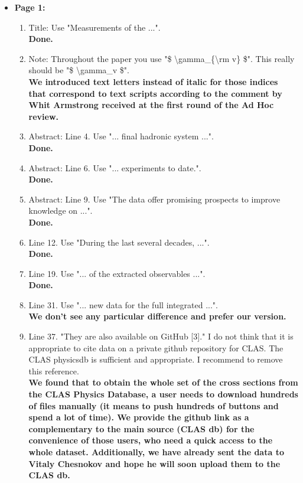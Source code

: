 \documentclass[,superscriptaddress,showpacs,amssymb,amsmath,amsfonts,linenumbers,article]{revtex4-1}
\begin{document}
\begin{itemize}
\item {\bf \large Page 1:}
\begin{enumerate} 

\item Title: Use "Measurements of the ...". \\
{\bf Done.}
\item Note: Throughout the paper you use "\$ \textbackslash gamma\_\{\textbackslash rm v\} \$". This really should   be "\$ \textbackslash gamma\_v \$".\\
{\bf We introduced text letters instead of italic for those indices that correspond to text scripts according to the comment by Whit Armstrong received at the first round of the Ad Hoc review.}
\item Abstract: Line 4. Use "... final hadronic system ...". \\
{\bf Done.}
\item Abstract: Line 6. Use "... experiments to date.". \\
{\bf Done.}
\item Abstract: Line 9.  Use "The data offer promising prospects to improve knowledge on ...". \\
{\bf Done.}
\item Line 12. Use "During the last several decades, ...". \\
{\bf Done.}
\item Line 19. Use "...  of the extracted observables ...". \\
{\bf Done.}
\item Line 31. Use "...  new data for the full integrated ...".\\
{\bf We don't see any particular difference and prefer our version.}
\item Line 37. "They are also available on GitHub [3]." I do not think that it is appropriate  to cite data on a private github repository for CLAS. The CLAS physicsdb is   sufficient and appropriate. I recommend to remove this reference.\\
{\bf We found that to obtain the whole set of the cross sections from the CLAS Physics Database, a user needs to download hundreds of files manually (it means to push hundreds of buttons and spend a lot of time). We provide the github link as a complementary to the main source (CLAS db) for the convenience of those users, who need a quick access to the whole dataset. Additionally, we have already sent the data to Vitaly Chesnokov and hope he will soon upload them to the CLAS db.}

\end{enumerate}
\end{itemize}
\end{document}
